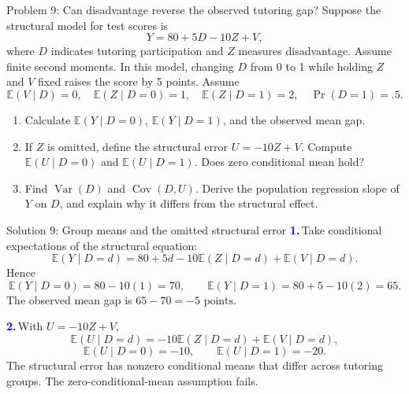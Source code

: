 \documentclass[notes,10pt, aspectratio=169]{beamer}
\newif\ifshowsolutions
\newcommand{\E}{\mathbb{E}}
\newcommand{\Var}{\operatorname{Var}}
\newcommand{\Cov}{\operatorname{Cov}}
\newcommand{\answerpart}[1]{\textcolor{blue}{\textbf{#1.}}\,}
\begin{document}
\begin{frame}{Problem 9: Can disadvantage reverse the observed tutoring gap?}
Suppose the structural model for test scores is
\[
Y=80+5D-10Z+V,
\]
where $D$ indicates tutoring participation and $Z$ measures disadvantage. Assume finite second moments. In this model, changing $D$ from 0 to 1 while holding $Z$ and $V$ fixed raises the score by 5 points. Assume
\[
\E(V\mid D)=0,\quad
\E(Z\mid D=0)=1,\quad \E(Z\mid D=1)=2,\quad
\Pr(D=1)=.5.
\]
\begin{enumerate}
\setlength{\itemsep}{8pt}
\item Calculate $\E(Y\mid D=0)$, $\E(Y\mid D=1)$, and the observed mean gap.
\item If $Z$ is omitted, define the structural error $U=-10Z+V$. Compute $\E(U\mid D=0)$ and $\E(U\mid D=1)$. Does zero conditional mean hold?
\item Find $\Var(D)$ and $\Cov(D,U)$. Derive the population regression slope of $Y$ on $D$, and explain why it differs from the structural effect.
\end{enumerate}
\end{frame}

\ifshowsolutions
\begin{frame}{Solution 9: Group means and the omitted structural error}
\small
\answerpart{1}Take conditional expectations of the structural equation:
\[
\E(Y\mid D=d)=80+5d-10\E(Z\mid D=d)+\E(V\mid D=d).
\]
Hence
\[
\E(Y\mid D=0)=80-10(1)=70,
\qquad
\E(Y\mid D=1)=80+5-10(2)=65.
\]
The observed mean gap is $65-70=\boxed{-5\text{ points}}$.
\par\vspace{8pt}
\answerpart{2}With $U=-10Z+V$,
\[
\E(U\mid D=d)=-10\E(Z\mid D=d)+\E(V\mid D=d),
\]
\[
\E(U\mid D=0)=-10,
\qquad
\E(U\mid D=1)=-20.
\]
The structural error has nonzero conditional means that differ across tutoring groups. The zero-conditional-mean assumption fails.
\end{frame}
\end{document}
